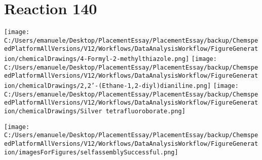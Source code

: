 \documentclass{article}%
\begin{document}
\section*{Reaction 140}%
%
\begin{scheme}[H]%
\begin{minipage}{0.5\textwidth}%
\texttt{[image: C:/Users/emanuele/Desktop/PlacementEssay/PlacementEssay/backup/ChemspeedPlatformAllVersions/V12/Workflows/DataAnalysisWorkflow/FigureGeneration/chemicalDrawings/4-Formyl-2-methylthiazole.png]}%
\texttt{[image: C:/Users/emanuele/Desktop/PlacementEssay/PlacementEssay/backup/ChemspeedPlatformAllVersions/V12/Workflows/DataAnalysisWorkflow/FigureGeneration/chemicalDrawings/2,2'-(Ethane-1,2-diyl)dianiline.png]}%
\texttt{[image: C:/Users/emanuele/Desktop/PlacementEssay/PlacementEssay/backup/ChemspeedPlatformAllVersions/V12/Workflows/DataAnalysisWorkflow/FigureGeneration/chemicalDrawings/Silver tetrafluoroborate.png]}%
\end{minipage}%
\begin{minipage}{0.5\textwidth}%
\begin{center}%
\texttt{[image: C:/Users/emanuele/Desktop/PlacementEssay/PlacementEssay/backup/ChemspeedPlatformAllVersions/V12/Workflows/DataAnalysisWorkflow/FigureGeneration/imagesForFigures/selfassemblySuccessful.png]}%
\end{center}%
\end{minipage}%
\caption{Self-assembly of components 1, 20, with Silver(I) in a 3.0:1.5:1.0 molar ratio in CH$_3$CN at 60\textdegree C for 40h. These are the reagents (starting materials) for reaction 140.}%
\end{scheme}%
\end{document}
